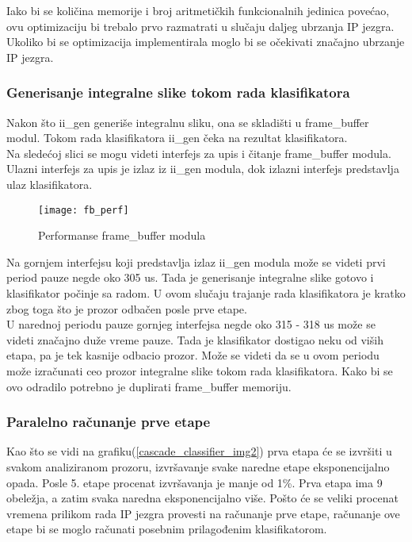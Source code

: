 Iako bi se količina memorije i broj aritmetičkih funkcionalnih jedinica povećao,
ovu optimizaciju bi trebalo prvo razmatrati u slučaju daljeg ubrzanja IP jezgra.
Ukoliko bi se optimizacija implementirala moglo bi se očekivati značajno ubrzanje IP jezgra.

\subsubsection{Generisanje integralne slike tokom rada klasifikatora}

Nakon što ii\_gen generiše integralnu sliku, ona se skladišti u frame\_buffer
modul.
Tokom rada klasifikatora ii\_gen čeka na rezultat klasifikatora. \\

Na sledećoj slici se mogu videti interfejs za upis i čitanje frame\_buffer
modula.
Ulazni interfejs za upis je izlaz iz ii\_gen modula, dok izlazni interfejs
predstavlja ulaz klasifikatora.

\begin{figure}[H]
  \centering
  \texttt{[image: fb\_perf]}
  \caption{Performanse frame\_buffer modula}
  \label{fb_perf}
\end{figure}

Na gornjem interfejsu koji predstavlja izlaz ii\_gen modula može se videti
prvi period pauze negde oko 305 us.
Tada je generisanje integralne slike gotovo i klasifikator počinje sa radom.
U ovom slučaju trajanje rada klasifikatora je kratko zbog toga što je prozor
odbačen posle prve etape. \\

U narednoj periodu pauze gornjeg interfejsa negde oko 315 - 318 us može se
videti značajno duže vreme pauze.
Tada je klasifikator dostigao neku od viših etapa, pa je tek kasnije odbacio
prozor.
Može se videti da se u ovom periodu može izračunati ceo prozor integralne slike
tokom rada klasifikatora.
Kako bi se ovo odradilo potrebno je duplirati frame\_buffer memoriju.

\subsubsection{Paralelno računanje prve etape}

Kao što se vidi na grafiku(\ref{cascade_classifier_img2}) prva etapa će se
izvršiti u svakom analiziranom prozoru, izvršavanje svake naredne etape
eksponencijalno opada.
Posle 5. etape procenat izvršavanja je manje od 1\%.
Prva etapa ima 9 obeležja, a zatim svaka naredna
eksponencijalno više.
Pošto će se veliki procenat vremena prilikom rada IP jezgra provesti na
računanje prve etape, računanje ove etape bi se moglo računati posebnim
prilagođenim klasifikatorom.


